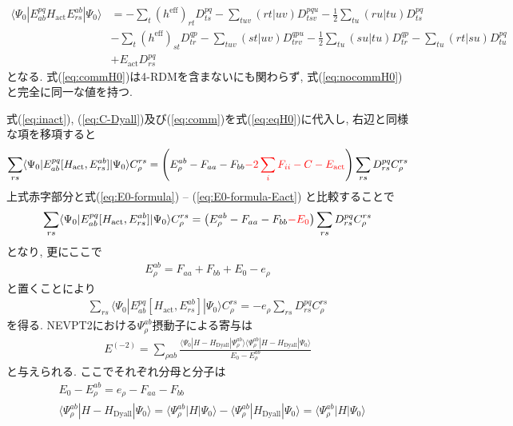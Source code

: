 \documentclass[11pt,pra,aps]{revtex4}
\newcommand{\red}[1]{\textcolor{red}{#1}}
\begin{document}
\begin{align}
  \langle\Psi_0|E^{pq}_{ab}H_\text{act}E_{rs}^{ab}|\Psi_0\rangle &= - \sum_{t} (h^\text{eff})_{rt} D^{pq}_{ts} - \sum_{tuv} (rt|uv) D^{pqu}_{tsv} - \frac{1}{2} \sum_{tu} (ru|tu) D^{pq}_{ts} \nonumber \\
  &- \sum_{t} (h^\text{eff})_{st} D^{qp}_{tr} - \sum_{tuv} (st|uv) D^{qpu}_{trv} - \frac{1}{2} \sum_{tu} (su|tu) D^{qp}_{tr} - \sum_{tu} (rt|su) D^{pq}_{tu} \nonumber \\
  &+E_\text{act}D^{pq}_{rs} \label{eq:commH0}
\end{align}
となる. 式(\ref{eq:commH0})は4-RDMを含まないにも関わらず, 式(\ref{eq:nocommH0})と完全に同一な値を持つ. 

式(\ref{eq:inact}), (\ref{eq:C-Dyall})及び(\ref{eq:comm})を式(\ref{eq:eqH0})に代入し, 右辺と同様な項を移項すると
\begin{align}
  \sum_{rs} \langle\Psi_0|E^{pq}_{ab}[H_\text{act},E_{rs}^{ab}]|\Psi_0\rangle C_\rho^{rs}=\left(E_{\rho}^{ab}-F_{aa}-F_{bb}\red{-2\sum_i F_{ii}-C-E_\text{act}}\right)\sum_{rs} D^{pq}_{rs} C_\rho^{rs} \label{eq:eqH0_2}
\end{align}
上式赤字部分と式(\ref{eq:E0-formula}) -- (\ref{eq:E0-formula-Eact}) と比較することで
\begin{align}
  \sum_{rs} \langle\Psi_0|E^{pq}_{ab}[H_\text{act},E_{rs}^{ab}]|\Psi_0\rangle C_\rho^{rs}=\left(E_{\rho}^{ab}-F_{aa}-F_{bb}\red{-E_0}\right)\sum_{rs} D^{pq}_{rs} C_\rho^{rs} \label{eq:eqH0_2}
\end{align}
となり, 更にここで
\begin{align}
  E_{\rho}^{ab}=F_{aa}+F_{bb}+E_0-e_\rho
\end{align}
と置くことにより
\begin{align}
  \sum_{rs} \langle\Psi_0|E^{pq}_{ab}[H_\text{act},E_{rs}^{ab}]|\Psi_0\rangle C_\rho^{rs}=-e_\rho\sum_{rs} D^{pq}_{rs} C_\rho^{rs} \label{eq:eqH0_3}
\end{align}
を得る. NEVPT2における$\Psi_\rho^{ab}$摂動子による寄与は
\begin{align}
  E^{(-2)}=\sum_{\rho ab} \frac{\langle\Psi_0|H-H_\text{Dyall}|\Psi_{\rho}^{ab}\rangle\langle\Psi_{\rho}^{ab}|H-H_\text{Dyall}|\Psi_0\rangle}{E_0-E_\rho^{ab}} \label{eq:S-2}
\end{align}
と与えられる. ここでそれぞれ分母と分子は
\begin{align}
  &E_0-E_{\rho}^{ab}=e_\rho-F_{aa}-F_{bb} \\
  &\langle\Psi_{\rho}^{ab}|H-H_\text{Dyall}|\Psi_0\rangle=\langle\Psi_{\rho}^{ab}|H|\Psi_0\rangle-\langle\Psi_{\rho}^{ab}|H_\text{Dyall}|\Psi_0\rangle=\langle\Psi_{\rho}^{ab}|H|\Psi_0\rangle \label{eq:num}
\end{align}
\end{document}
